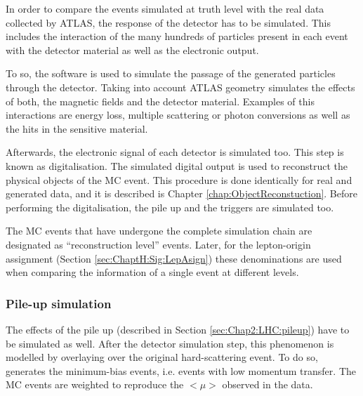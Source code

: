 In order to compare the events simulated at truth level with the real data
collected by ATLAS, the response of the detector has to be simulated. 
This includes the interaction of the many hundreds of particles present
in each event with the detector material as well as the electronic output. 

To so, the \GEANT software \cite{GEANT4:2002zbu} is used to simulate the passage of 
the generated particles through the detector. Taking into account ATLAS
geometry \GEANT simulates the effects of both, the magnetic fields and 
the detector material. Examples of this interactions are energy loss, multiple
scattering or photon conversions as well as the hits in the sensitive material.

Afterwards, the electronic signal of each detector is simulated too. This
step is known as digitalisation. The simulated digital output is used to 
reconstruct the physical objects of the MC event. This procedure is 
done identically for real and generated data, and it is described is
Chapter \ref{chap:ObjectReconstuction}. Before performing the
digitalisation, the pile up and the triggers are simulated too.

The MC events that have undergone the complete simulation chain 
are designated as ``reconstruction level'' events. Later, for the
lepton-origin assignment (Section \ref{sec:ChaptH:Sig:LepAsign})
these denominations are used when comparing the information of 
a single event at different levels.

 

\subsubsection{Pile-up simulation}
\label{chap:DataAndMC:pileup}
The effects of the pile up (described in Section \ref{sec:Chap2:LHC:pileup}) have to
be simulated as well. After the detector simulation step, this phenomenon is modelled 
by overlaying over the original hard-scattering event. To do so, \PYTHIA[8] generates
the minimum-bias events, i.e. events with low momentum transfer. The MC events are 
weighted to reproduce the $<\mu>$ observed in the data. 


